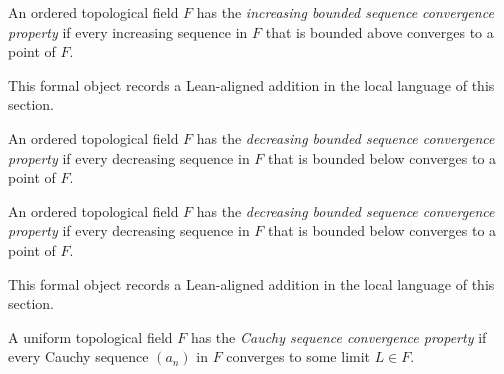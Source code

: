 \begin{remark*}
An ordered topological field $F$ has the \emph{increasing bounded sequence convergence property} if every increasing sequence in $F$ that is bounded above converges to a point of $F$.
\end{remark*}

\begin{remark*}[Interpretation]
This formal object records a Lean-aligned addition in the local language of this section.
\end{remark*}

\begin{dependencies}
\NoLocalDependencies
\end{dependencies}
\begin{definition}
\label{def:decreasing-bounded-sequences-converge}
An ordered topological field $F$ has the \emph{decreasing bounded sequence convergence property} if every decreasing sequence in $F$ that is bounded below converges to a point of $F$.
\end{definition}

\begin{remark*}
An ordered topological field $F$ has the \emph{decreasing bounded sequence convergence property} if every decreasing sequence in $F$ that is bounded below converges to a point of $F$.
\end{remark*}

\begin{remark*}[Interpretation]
This formal object records a Lean-aligned addition in the local language of this section.
\end{remark*}

\begin{dependencies}
\NoLocalDependencies
\end{dependencies}
\begin{definition}
\label{def:cauchy-sequences-converge}
A uniform topological field $F$ has the \emph{Cauchy sequence convergence property} if every Cauchy sequence $(a_n)$ in $F$ converges to some limit $L\in F$.
\end{definition}

